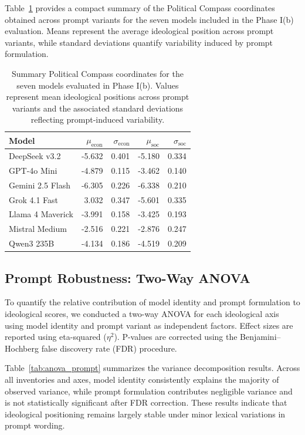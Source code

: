 \documentclass[11pt]{article}
\begin{document}
Table~\ref{tab:phaseib_summary} provides a compact summary of the Political Compass coordinates obtained across prompt variants for the seven models included in the Phase I(b) evaluation. Means represent the average ideological position across prompt variants, while standard deviations quantify variability induced by prompt formulation.

\begin{table}[t]
\centering
\small
\setlength{\tabcolsep}{5pt}
\begin{tabular}{l r r r r}
\toprule
\textbf{Model} & $\mu_{\text{econ}}$ & $\sigma_{\text{econ}}$ & $\mu_{\text{soc}}$ & $\sigma_{\text{soc}}$ \\
\midrule
DeepSeek v3.2      & -5.632 & 0.401 & -5.180 & 0.334 \\
GPT-4o Mini        & -4.879 & 0.115 & -3.462 & 0.140 \\
Gemini 2.5 Flash   & -6.305 & 0.226 & -6.338 & 0.210 \\
Grok 4.1 Fast      &  3.032 & 0.347 & -5.601 & 0.335 \\
Llama 4 Maverick   & -3.991 & 0.158 & -3.425 & 0.193 \\
Mistral Medium     & -2.516 & 0.221 & -2.876 & 0.247 \\
Qwen3 235B         & -4.134 & 0.186 & -4.519 & 0.209 \\
\bottomrule
\end{tabular}
\caption{Summary Political Compass coordinates for the seven models evaluated in Phase I(b). Values represent mean ideological positions across prompt variants and the associated standard deviations reflecting prompt-induced variability.}
\label{tab:phaseib_summary}
\end{table}



\subsection{Prompt Robustness: Two-Way ANOVA}
\label{app:phaseib-anova}

To quantify the relative contribution of model identity and prompt formulation
to ideological scores, we conducted a two-way ANOVA for each ideological axis
using model identity and prompt variant as independent factors. Effect sizes
are reported using eta-squared ($\eta^2$). P-values are corrected using the
Benjamini–Hochberg false discovery rate (FDR) procedure.

Table~\ref{tab:anova_prompt} summarizes the variance decomposition results.
Across all inventories and axes, model identity consistently explains the
majority of observed variance, while prompt formulation contributes negligible
variance and is not statistically significant after FDR correction. These
results indicate that ideological positioning remains largely stable under
minor lexical variations in prompt wording.
\end{document}
